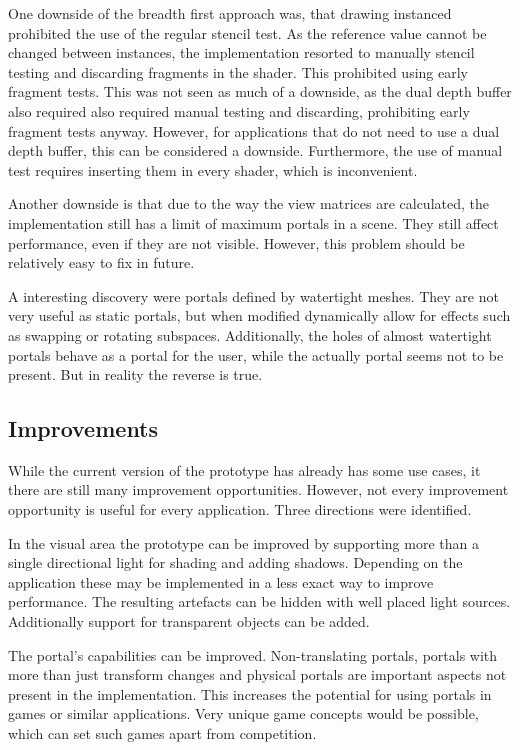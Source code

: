 One downside of the breadth first approach was, that drawing instanced prohibited the use of the regular stencil test. As the reference value cannot be changed between instances, the implementation resorted to manually stencil testing and discarding fragments in the shader. This prohibited using early fragment tests. This was not seen as much of a downside, as the dual depth buffer also required also required manual testing and discarding, prohibiting early fragment tests anyway. However, for applications that do not need to use a dual depth buffer, this can be considered a downside. Furthermore, the use of manual test requires inserting them in every shader, which is inconvenient.

Another downside is that due to the way the view matrices are calculated, the implementation still has a limit of maximum portals in a scene. They still affect performance, even if they are not visible. However, this problem should be relatively easy to fix in future.

A interesting discovery were portals defined by watertight meshes. They are not very useful as static portals, but when modified dynamically allow for effects such as swapping or rotating subspaces. Additionally, the holes of almost watertight portals behave as a portal for the user, while the actually portal seems not to be present. But in reality the reverse is true.


\subsection{Improvements}

While the current version of the prototype has already has some use cases, it there are still many improvement opportunities. However, not every improvement opportunity is useful for every application. Three directions were identified.

In the visual area the prototype can be improved by supporting more than a single directional light for shading and adding shadows. Depending on the application these may be implemented in a less exact way to improve performance. The resulting artefacts can be hidden with well placed light sources. Additionally support for transparent objects can be added.

The portal's capabilities can be improved. Non-translating portals, portals with more than just transform changes and physical portals are important aspects not present in the implementation. This increases the potential for using portals in games or similar applications. Very unique game concepts would be possible, which can set such games apart from competition.

